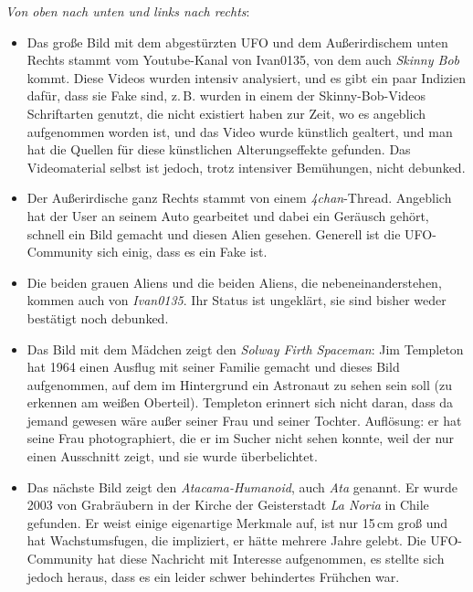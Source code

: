 \documentclass{scrartcl}
\begin{document}
\textit{Von oben nach unten und links nach rechts}:

\begin{itemize}
	\item Das große Bild mit dem abgestürzten UFO und dem Außerirdischem unten Rechts stammt vom Youtube-Kanal von Ivan0135, von dem auch \textit{Skinny Bob} kommt. Diese Videos wurden intensiv analysiert, und es gibt ein paar Indizien dafür, dass sie Fake sind, z.\,B. wurden in einem der Skinny-Bob-Videos Schriftarten genutzt, die nicht existiert haben zur Zeit, wo es angeblich aufgenommen worden ist, und das Video wurde künstlich gealtert, und man hat die Quellen für diese künstlichen Alterungseffekte gefunden. Das Videomaterial selbst ist jedoch, trotz intensiver Bemühungen, nicht debunked.  	
	\item Der Außerirdische ganz Rechts stammt von einem \textit{4chan}-Thread. Angeblich hat der User an seinem Auto gearbeitet und dabei ein Geräusch gehört, schnell ein Bild gemacht und diesen Alien gesehen. Generell ist die UFO-Community sich einig, dass es ein Fake ist. 
	\item Die beiden grauen Aliens und die beiden Aliens, die nebeneinanderstehen, kommen auch von \textit{Ivan0135}. Ihr Status ist ungeklärt, sie sind bisher weder bestätigt noch debunked.
	\item Das Bild mit dem Mädchen zeigt den \textit{Solway Firth Spaceman}: Jim Templeton hat 1964 einen Ausflug mit seiner Familie gemacht und dieses Bild aufgenommen, auf dem im Hintergrund ein Astronaut zu sehen sein soll (zu erkennen am weißen Oberteil). Templeton erinnert sich nicht daran, dass da jemand gewesen wäre außer seiner Frau und seiner Tochter. Auflösung: er hat seine Frau photographiert, die er im Sucher nicht sehen konnte, weil der nur einen Ausschnitt zeigt, und sie wurde überbelichtet. 
	\item Das nächste Bild zeigt den \textit{Atacama-Humanoid}, auch \textit{Ata} genannt. Er wurde 2003 von Grabräubern in der Kirche der Geisterstadt \textit{La Noria} in Chile gefunden. Er weist einige eigenartige Merkmale auf, ist nur 15\,cm groß und hat Wachstumsfugen, die impliziert, er hätte mehrere Jahre gelebt. Die UFO-Community hat diese Nachricht mit Interesse aufgenommen, es stellte sich jedoch heraus, dass es ein leider schwer behindertes Frühchen war. 

\end{itemize}
\end{document}
